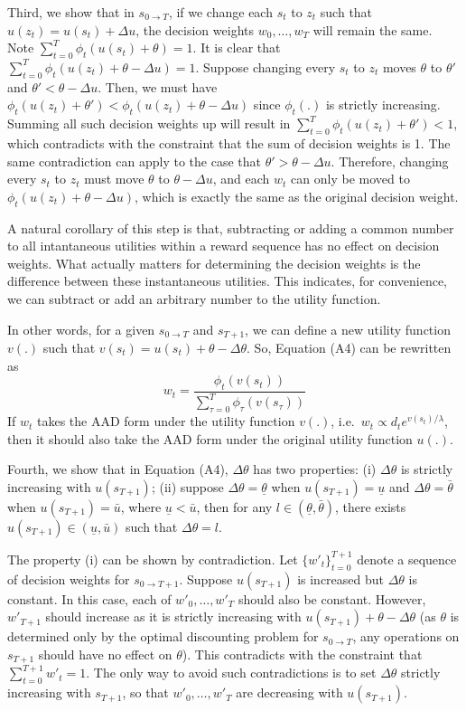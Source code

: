 \documentclass[
  12pt,
]{article}
\begin{document}
Third, we show that in \(s_{0\rightarrow T}\), if we change each \(s_t\)
to \(z_t\) such that \(u(z_t)=u(s_t)+\Delta u\), the decision weights
\(w_0,…,w_T\) will remain the same. Note
\(\sum_{t=0}^T \phi_t(u(s_t)+\theta)=1\). It is clear that
\(\sum_{t=0}^T \phi_t(u(z_t)+\theta-\Delta u)=1\). Suppose changing
every \(s_t\) to \(z_t\) moves \(\theta\) to \(\theta'\) and
\(\theta'<\theta-\Delta u\). Then, we must have
\(\phi_t(u(z_t)+\theta')<\phi_t(u(z_t)+\theta-\Delta u)\) since
\(\phi_t(.)\) is strictly increasing. Summing all such decision weights
up will result in \(\sum_{t=0}^T \phi_t(u(z_t)+\theta')<1\), which
contradicts with the constraint that the sum of decision weights is 1.
The same contradiction can apply to the case that
\(\theta'>\theta-\Delta u\). Therefore, changing every \(s_t\) to
\(z_t\) must move \(\theta\) to \(\theta - \Delta u\), and each \(w_t\)
can only be moved to \(\phi_t(u(z_t)+\theta -\Delta u)\), which is
exactly the same as the original decision weight.

A natural corollary of this step is that, subtracting or adding a common
number to all intantaneous utilities within a reward sequence has no
effect on decision weights. What actually matters for determining the
decision weights is the difference between these instantaneous
utilities. This indicates, for convenience, we can subtract or add an
arbitrary number to the utility function.

In other words, for a given \(s_{0\rightarrow T}\) and \(s_{T+1}\), we
can define a new utility function \(v(.)\) such that
\(v(s_t) = u(s_t) +\theta-\Delta \theta\). So, Equation (A4) can be
rewritten as\[\tag{A5}
w_t = \frac{\phi_t(v(s_t))}{\sum_{\tau=0}^{T}\phi_\tau(v(s_\tau))}
\]If \(w_t\) takes the AAD form under the utility function \(v(.)\),
i.e.~\(w_t \propto d_t e^{v(s_t)/\lambda}\), then it should also take
the AAD form under the original utility function \(u(.)\).

Fourth, we show that in Equation (A4), \(\Delta \theta\) has two
properties: (i) \(\Delta \theta\) is strictly increasing with
\(u(s_{T+1})\); (ii) suppose \(\Delta \theta = \underline{\theta}\) when
\(u(s_{T+1})=\underline{u}\) and \(\Delta\theta=\bar{\theta}\) when
\(u(s_{T+1})=\bar{u}\), where \(\underline{u}<\bar{u}\), then for any
\(l \in(\underline{\theta},\bar{\theta})\), there exists
\(u(s_{T+1})\in(\underline{u},\bar{u})\) such that
\(\Delta \theta = l\).

The property (i) can be shown by contradiction. Let
\(\{w'_t\}_{t=0}^{T+1}\) denote a sequence of decision weights for
\(s_{0\rightarrow T+1}\). Suppose \(u(s_{T+1})\) is increased but
\(\Delta \theta\) is constant. In this case, each of \(w'_0,…,w'_T\)
should also be constant. However, \(w'_{T+1}\) should increase as it is
strictly increasing with \(u(s_{T+1})+\theta-\Delta \theta\) (as
\(\theta\) is determined only by the optimal discounting problem for
\(s_{0\rightarrow T}\), any operations on \(s_{T+1}\) should have no
effect on \(\theta\)). This contradicts with the constraint that
\(\sum_{t=0}^{T+1} w'_t =1\). The only way to avoid such contradictions
is to set \(\Delta \theta\) strictly increasing with \(s_{T+1}\), so
that \(w'_0,…,w'_T\) are decreasing with \(u(s_{T+1})\).
\end{document}

